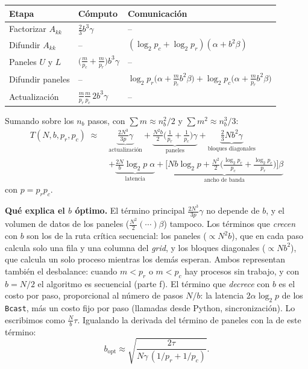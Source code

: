 \documentclass[11pt,a4paper]{article}
\begin{document}
\begin{center}
\small
\begin{tabular}{lll}
\toprule
\textbf{Etapa} & \textbf{Cómputo} & \textbf{Comunicación} \\
\midrule
Factorizar $A_{kk}$ & $\tfrac{2}{3}b^3\gamma$ & -- \\
Difundir $A_{kk}$ & -- & $(\log_2 p_c+\log_2 p_r)(\alpha+b^2\beta)$ \\
Paneles $U$ y $L$ & $\big(\tfrac{m}{p_c}+\tfrac{m}{p_r}\big)b^3\gamma$ & -- \\
Difundir paneles & -- & $\log_2 p_r\big(\alpha+\tfrac{m}{p_c}b^2\beta\big)+\log_2 p_c\big(\alpha+\tfrac{m}{p_r}b^2\beta\big)$ \\
Actualización & $\tfrac{m}{p_r}\tfrac{m}{p_c}\,2b^3\gamma$ & -- \\
\bottomrule
\end{tabular}
\end{center}

Sumando sobre los $n_b$ pasos, con $\sum m\approx n_b^2/2$ y $\sum m^2\approx n_b^3/3$:
\begin{align*}
T(N,b,p_r,p_c) \;\approx\;&
\underbrace{\frac{2N^3}{3p}\gamma}_{\text{actualización}}
+\underbrace{\frac{N^2b}{2}\Big(\frac{1}{p_r}+\frac{1}{p_c}\Big)\gamma}_{\text{paneles}}
+\underbrace{\frac{2}{3}Nb^2\gamma}_{\text{bloques diagonales}}\\[2pt]
&+\underbrace{\frac{2N}{b}\log_2 p\;\alpha}_{\text{latencia}}
+\underbrace{\Big[Nb\log_2 p+\frac{N^2}{2}\Big(\frac{\log_2 p_r}{p_c}+\frac{\log_2 p_c}{p_r}\Big)\Big]\beta}_{\text{ancho de banda}}
\end{align*}
con $p=p_rp_c$.

\textbf{Qué explica el $b$ óptimo.} El término principal $\tfrac{2N^3}{3p}\gamma$ no depende de $b$, y el volumen de datos de los paneles ($\tfrac{N^2}{2}(\cdots)\beta$) tampoco. Los términos que \emph{crecen} con $b$ son los de la ruta crítica secuencial: los paneles ($\propto N^2b$), que en cada paso calcula solo una fila y una columna del \emph{grid}, y los bloques diagonales ($\propto Nb^2$), que calcula un solo proceso mientras los demás esperan. Ambos representan también el desbalance: cuando $m<p_r$ o $m<p_c$ hay procesos sin trabajo, y con $b=N/2$ el algoritmo es secuencial (parte f). El término que \emph{decrece} con $b$ es el costo por paso, proporcional al número de pasos $N/b$: la latencia $2\alpha\log_2 p$ de los \texttt{Bcast}, más un costo fijo por paso (llamadas desde Python, sincronización). Lo escribimos como $\tfrac{N}{b}\tau$. Igualando la derivada del término de paneles con la de este término:
\[
b_{\text{opt}}\approx\sqrt{\frac{2\tau}{N\gamma\,(1/p_r+1/p_c)}}.
\]
\end{document}
